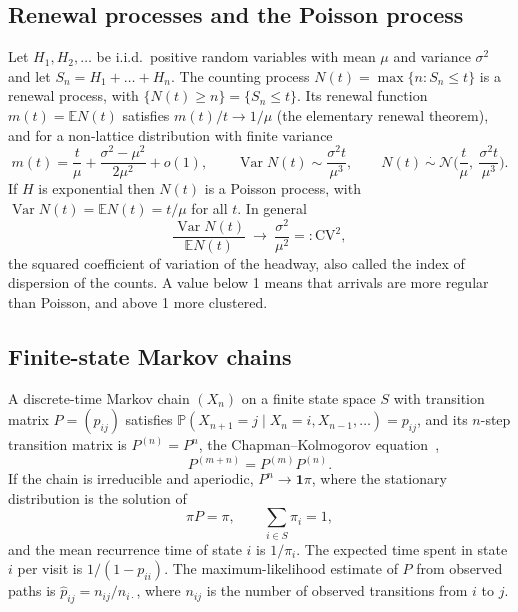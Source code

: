 \documentclass[11pt,a4paper]{article}
\numberwithin{equation}{section}
\newcommand{\E}{\mathbb{E}}
\newcommand{\Var}{\operatorname{Var}}
\newcommand{\Prob}{\mathbb{P}}
\begin{document}
\subsection{Renewal processes and the Poisson process}
Let $H_1,H_2,\dots$ be i.i.d.\ positive random variables with mean $\mu$ and variance $\sigma^2$ and let $S_n=H_1+\dots+H_n$.
The counting process $N(t)=\max\{n: S_n\le t\}$ is a renewal process, with $\{N(t)\ge n\}=\{S_n\le t\}$. Its renewal function
$m(t)=\E N(t)$ satisfies $m(t)/t\to1/\mu$ (the elementary renewal theorem), and for a non-lattice distribution with finite
variance~\cite{cox1962,ross1996}
\begin{equation}\label{eq:renewal}
m(t)=\frac t\mu+\frac{\sigma^2-\mu^2}{2\mu^2}+o(1),\qquad \Var N(t)\sim\frac{\sigma^2t}{\mu^3},\qquad
N(t)\ \overset{\cdot}{\sim}\ \mathcal N\!\Big(\frac t\mu,\ \frac{\sigma^2t}{\mu^3}\Big).
\end{equation}
If $H$ is exponential then $N(t)$ is a Poisson process, with $\Var N(t)=\E N(t)=t/\mu$ for all $t$. In general
\begin{equation}\label{eq:dispersion}
\frac{\Var N(t)}{\E N(t)}\ \longrightarrow\ \frac{\sigma^2}{\mu^2}=:\mathrm{CV}^2,
\end{equation}
the squared coefficient of variation of the headway, also called the index of dispersion of the counts. A value below 1 means that arrivals are more regular than Poisson, and above 1 more clustered.

\subsection{Finite-state Markov chains}
A discrete-time Markov chain $(X_n)$ on a finite state space $S$ with transition matrix $P=(p_{ij})$ satisfies
$\Prob(X_{n+1}=j\mid X_n=i,X_{n-1},\dots)=p_{ij}$, and its $n$-step transition matrix is $P^{(n)}=P^n$, the
Chapman--Kolmogorov equation~\cite{norris1997},
\begin{equation}\label{eq:ck}
P^{(m+n)}=P^{(m)}P^{(n)} .
\end{equation}
If the chain is irreducible and aperiodic, $P^n\to\mathbf1\pi$, where the stationary distribution is the solution of
\begin{equation}\label{eq:stationary}
\pi P=\pi,\qquad \sum_{i\in S}\pi_i=1 ,
\end{equation}
and the mean recurrence time of state $i$ is $1/\pi_i$. The expected time spent in state $i$ per visit is $1/(1-p_{ii})$. The maximum-likelihood estimate of $P$ from observed paths is
$\hat p_{ij}=n_{ij}/n_{i\cdot}$, where $n_{ij}$ is the number of observed transitions from $i$ to $j$.
\end{document}
